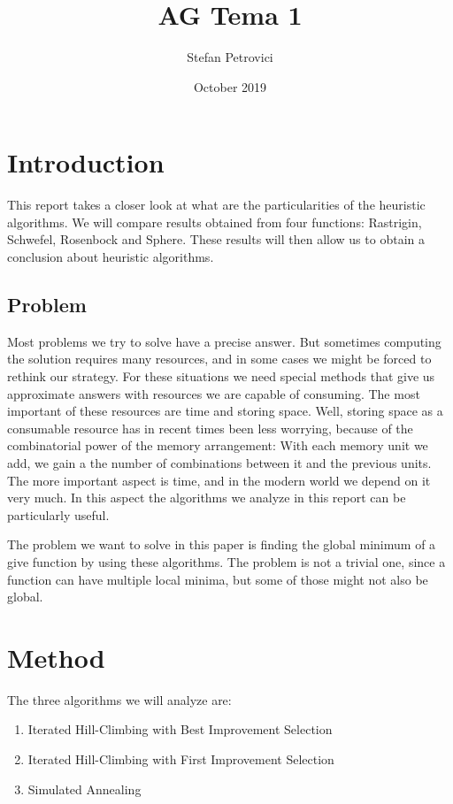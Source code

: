 \documentclass{article}
\title{AG Tema 1}
\author{Stefan Petrovici}
\date{October 2019}
\begin{document}
\maketitle

\section{Introduction}
This report takes a closer look at what are the particularities of the heuristic algorithms. We will compare results obtained from four functions: Rastrigin, Schwefel, Rosenbock and Sphere. These results will then allow us to obtain a conclusion about heuristic algorithms.

\subsection{Problem}
Most problems we try to solve have a precise answer. But sometimes computing the solution requires many resources, and in some cases we might be forced to rethink our strategy. For these situations we need special methods that give us approximate answers with resources we are capable of consuming.
The most important of these resources are time and storing space. Well, storing space as a consumable resource has in recent times been less worrying, because of the combinatorial power of the memory arrangement: With each memory unit we add, we gain a the number of combinations between it and the previous units.
The more important aspect is time, and in the modern world we depend on it very much. In this aspect the algorithms we analyze in this report can be particularly useful.

The problem we want to solve in this paper is finding the global minimum of a give function by using these algorithms. The problem is not a trivial one, since a function can have multiple local minima, but some of those might not also be global.

\section{Method}

The three algorithms we will analyze are:
\begin{enumerate}
\item Iterated Hill-Climbing with Best Improvement Selection
\item Iterated Hill-Climbing with First Improvement Selection
\item Simulated Annealing
\end{enumerate} 
\end{document}
